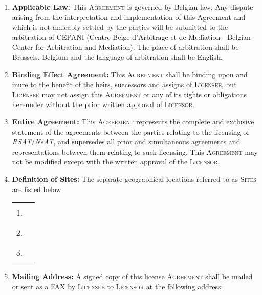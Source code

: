 \documentclass[12pt]{article}
\newcommand{\RSAT}[0]{\emph{RSAT}\xspace}
\newcommand{\NeAT}[0]{\emph{NeAT}\xspace}
\newcommand{\Licensor}[0]{\textsc{Licensor}\xspace}
\newcommand{\Licensee}[0]{\textsc{Licensee}\xspace}
\newcommand{\Agreement}[0]{\textsc{Agreement}\xspace}
\newcommand{\Sites}[0]{\textsc{Sites}\xspace}
\newcommand{\Fillline}[0]{\rule{10cm}{1pt}}
\newcommand{\Paragraph}[2]{\item \textbf{#1:} #2}
\begin{document}
\begin{enumerate}
{%
}

\Paragraph{Applicable Law}{This \Agreement is governed by Belgian law. Any
dispute arising from the interpretation and implementation of this
Agreement and which is not amicably settled by the parties will be
submitted to the arbitration of CEPANI (Centre Belge d'Arbitrage et de
Mediation - Belgian Center for Arbitration and Mediation). The place
of arbitration shall be Brussels, Belgium and the language of
arbitration shall be English.

}

\Paragraph{Binding Effect Agreement}{This \Agreement shall be binding 
upon and inure to the benefit of the heirs, successors and assigns of 
\Licensee, but \Licensee may not assign this \Agreement or any of its 
rights or obligations hereunder without the prior written approval of 
\Licensor.
}

\Paragraph{Entire Agreement}{This \Agreement represents the complete 
and exclusive statement of the agreements between the parties 
relating to the licensing of \RSAT/\NeAT, and supersedes all 
prior and simultaneous agreements and representations between them 
relating to such licensing. This \Agreement may not be modified except 
with the written approval of the \Licensor.
}

\Paragraph{Definition of Sites}{
The separate geographical locations 
referred to as \Sites are listed below:

\begin{center}
\begin{tabular}{ll}
1.&\Fillline\\[5mm]
2.&\Fillline\\[5mm]
3.&\Fillline
\end{tabular}
\end{center}
}
\label{DefSites}


\Paragraph{Mailing Address}{A signed copy of this license \Agreement
shall be mailed or sent as a FAX by \Licensee to \Licensor at the 
following address:

}
\end{enumerate}
\end{document}
